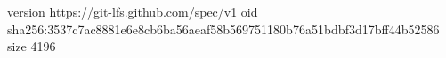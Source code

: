 version https://git-lfs.github.com/spec/v1
oid sha256:3537c7ac8881e6e8cb6ba56aeaf58b569751180b76a51bdbf3d17bff44b52586
size 4196
